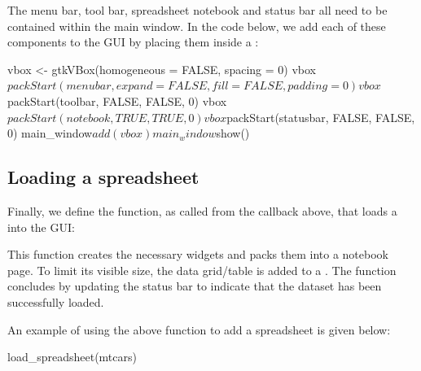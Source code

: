 \documentclass[article,shortnames]{jss}
\begin{document}
The menu bar, tool bar, spreadsheet notebook and status bar all need
to be contained within the main window. In the code below, we add each
of these components to the GUI by placing them inside a
:
\begin{Code}
vbox <- gtkVBox(homogeneous = FALSE, spacing = 0)
vbox$packStart(menubar, expand = FALSE, fill = FALSE, padding = 0)
vbox$packStart(toolbar, FALSE, FALSE, 0)
vbox$packStart(notebook, TRUE, TRUE, 0)
vbox$packStart(statusbar, FALSE, FALSE, 0)
main_window$add(vbox)
main_window$show()
\end{Code}

\subsection{Loading a spreadsheet}

Finally, we define the  function, as called
from the  callback above, that loads a
 into the GUI:
This function creates the necessary
widgets and packs them into a notebook page. To limit its visible
size, the data grid/table is added to a .
The function concludes by updating the status bar to indicate that the
dataset has been successfully loaded. 

An example of using the above function to add a spreadsheet is given
below:
\begin{Code}
load_spreadsheet(mtcars)
\end{Code}
\end{document}
